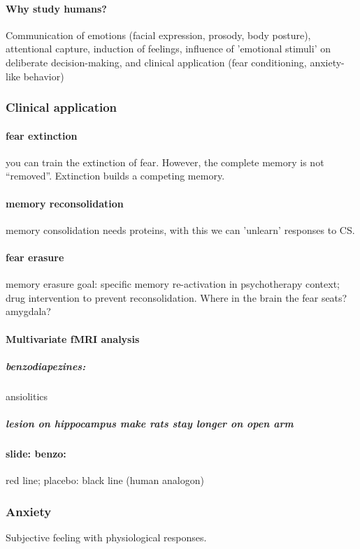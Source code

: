 \documentclass[12pt,article,oneside,a4paper]{memoir}
\begin{document}
\paragraph{Why study humans?} Communication of emotions (facial expression, prosody, body posture), attentional capture, induction of feelings, influence of 'emotional stimuli' on deliberate decision-making, and clinical application (fear conditioning, anxiety-like behavior)

\subsubsection{Clinical application}
\paragraph{fear extinction} you can train the extinction of fear. However, the complete memory is not ``removed''. Extinction builds a competing memory.
\paragraph{memory reconsolidation} memory consolidation needs proteins, with this we can 'unlearn' responses to CS.
\paragraph{fear erasure} memory erasure goal: specific memory re-activation in psychotherapy context; drug intervention to prevent reconsolidation. 
Where in the brain the fear seats? amygdala?

\paragraph{Multivariate fMRI analysis}
\subparagraph{benzodiapezines:} ansiolitics
\subparagraph{lesion on hippocampus make rats stay longer on open arm}
\paragraph{slide: benzo:} red line; placebo: black line (human analogon)

\subsubsection{Anxiety}
Subjective feeling with physiological responses.

\newpage
\end{document}
